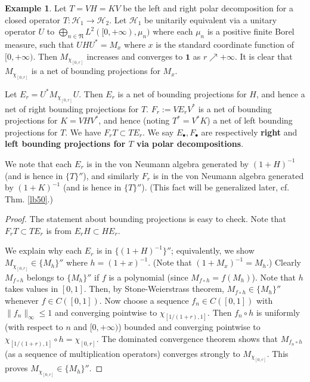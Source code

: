 \documentclass[12pt,b5paper,notitlepage]{article}
\theoremstyle{definition}
\newtheorem{eg}[df]{Example}
\theoremstyle{plain}
\newcommand{\fk}{\mathfrak}
\newcommand{\mc}{\mathcal}
\newcommand{\idt}{\mathbf{1}}
\newcommand{\blt}{\bullet}
\numberwithin{equation}{section}
\begin{document}
\begin{eg}\label{lb37}
Let $T=VH=KV$ be the left and right polar decomposition for a closed operator $T:\mc H_1\rightarrow\mc H_2$. Let $\mc H_1$ be unitarily equivalent via a unitary operator $U$ to $\bigoplus_{n\in\fk N}L^2([0,+\infty),\mu_n)$ where each $\mu_n$ is a positive finite  Borel measure, such that $UHU^*=M_x$ where $x$ is the standard coordinate function of $[0,+\infty)$.  Then $M_{\chi_{[0,r]}}$ increases and converges to $\idt$ as $r\nearrow+\infty$. It is clear that $M_{\chi_{[0,r]}}$ is a net of bounding projections for $M_x$.  

Let $E_r=U^*M_{\chi_{[0,r]}}U$. Then $E_r$ is a net of bounding projections for $H$, and hence a net of right bounding projections for $T$. $F_r:=VE_rV^*$ is a net of bounding projections for $K=VHV^*$, and hence (noting $T^*=V^*K$) a net of left bounding projections for $T$. We have $F_rT\subset TE_r$. We say $E_\blt,F_\blt$ are respectively \textbf{right} and \textbf{left bounding projections for $T$ via polar decompositions}.  

We note that each $E_r$ is in the von Neumann algebra generated by $(1+H)^{-1}$ (and is hence in $\{T\}''$), and similarly $F_r$ is in the von Neumann algebra generated by $(1+K)^{-1}$ (and is hence in $\{T\}''$). (This fact will be generalized later, cf. Thm. \ref{lb50}.)
\end{eg}


\begin{proof}
The statement about bounding projections is easy to check. Note that $F_rT\subset TE_r$ is from $E_rH\subset HE_r$.
	
We explain why each $E_r$ is in $\{(1+H)^{-1}\}''$; equivalently, we show $M_{\chi_{[0,r]}}\in\{M_h\}''$ where $h=(1+x)^{-1}$. (Note that $(1+M_x)^{-1}=M_h$.) Clearly $M_{f\circ h}$ belongs to $\{M_h\}''$ if $f$ is a polynomial (since $M_{f\circ h}=f(M_h)$). Note that $h$ takes values in $[0,1]$. Then, by Stone-Weierstrass theorem,  $M_{f\circ h}\in\{M_h\}''$ whenever $f\in C([0,1])$. Now choose a sequence $f_n\in C([0,1])$ with $\lVert f_n\lVert_\infty\leq1$ and converging pointwise to $\chi_{[1/(1+r),1]}$. Then $f_n\circ h$ is uniformly (with respect to $n$ and $[0,+\infty)$) bounded and converging pointwise  to $\chi_{[1/(1+r),1]}\circ h=\chi_{[0,r]}$. The dominated convergence theorem shows that $M_{f_n\circ h}$ (as a sequence of multiplication operators) converges strongly to $M_{\chi_{[0,r]}}$. This proves $M_{\chi_{[0,r]}}\in\{M_h\}''$.
\end{proof}
\end{document}
